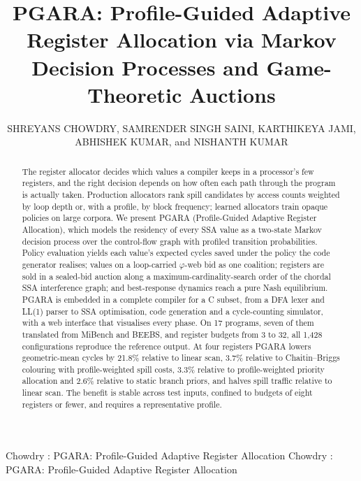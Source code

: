 \documentclass{ieeeaccess}
\begin{document}
\newlength{\xfigwd}
\setlength{\xfigwd}{\columnwidth}


\title{PGARA: Profile-Guided Adaptive Register Allocation via Markov
Decision Processes and Game-Theoretic Auctions}

\author{\uppercase{Shreyans Chowdry},
\uppercase{Samrender Singh Saini},
\uppercase{Karthikeya Jami},
\uppercase{Abhishek Kumar}, and
\uppercase{Nishanth Kumar}}

\address[1]{School of Computer Science and Engineering, Vellore Institute
of Technology, Vellore, Tamil Nadu 632014, India (e-mail:
shreyans.chowdry2024@vitstudent.ac.in;
samrender.singh2024@vitstudent.ac.in;
jami.karthikeya2024@vitstudent.ac.in;
abhishek.kumar2024b@vitstudent.ac.in;
akula.nishanthkumar2024@vitstudent.ac.in)}


\markboth
{Chowdry \headeretal: PGARA: Profile-Guided Adaptive Register Allocation}
{Chowdry \headeretal: PGARA: Profile-Guided Adaptive Register Allocation}


\begin{abstract}
The register allocator decides which values a compiler keeps in a
processor's few registers, and the right decision depends on how often
each path through the program is actually taken. Production allocators
rank spill candidates by access counts weighted by loop depth or, with a
profile, by block frequency; learned allocators train opaque policies on
large corpora. We present PGARA (Profile-Guided Adaptive Register
Allocation), which models the residency of every SSA value as a
two-state Markov decision process over the control-flow graph with
profiled transition probabilities. Policy evaluation yields each value's
expected cycles saved under the policy the code generator realises;
values on a loop-carried $\varphi$-web bid as one coalition; registers
are sold in a sealed-bid auction along a maximum-cardinality-search
order of the chordal SSA interference graph; and best-response dynamics
reach a pure Nash equilibrium. PGARA is embedded in a complete compiler
for a C subset, from a DFA lexer and LL(1) parser to SSA optimisation,
code generation and a cycle-counting simulator, with a web interface
that visualises every phase. On 17 programs, seven of them translated
from MiBench and BEEBS, and register budgets from 3 to 32, all 1{,}428
configurations reproduce the reference output. At four registers PGARA
lowers geometric-mean cycles by 21.8\% relative to linear scan, 3.7\%
relative to Chaitin--Briggs colouring with profile-weighted spill costs,
3.3\% relative to profile-weighted priority allocation and 2.6\%
relative to static branch priors, and halves spill traffic relative to
linear scan. The benefit is stable across test inputs, confined to
budgets of eight registers or fewer, and requires a representative
profile.
\end{abstract}
\end{document}
